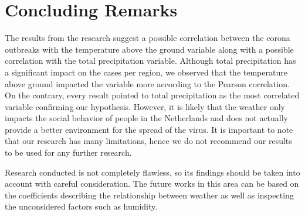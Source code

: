\section{Concluding Remarks}

The results from the research suggest a possible correlation between the corona outbreaks with the temperature above the ground variable along with a possible correlation with the total precipitation variable. Although total precipitation has a significant impact on the cases per region, we observed that the temperature above ground impacted the variable more according to the Pearson correlation. On the contrary,  every result pointed to total precipitation as the most correlated variable confirming our hypothesis. However, it is likely that the weather only impacts the social behavior of people in the Netherlands and does not actually provide a better environment for the spread of the virus. It is important to note that our research has many limitations, hence we do not recommend our results to be used for any further research.

Research conducted is not completely flawless, so its findings should be taken into account with careful consideration. The future works in this area can be based on the coefficients describing the relationship between weather as well as inspecting the unconsidered factors such as humidity.
